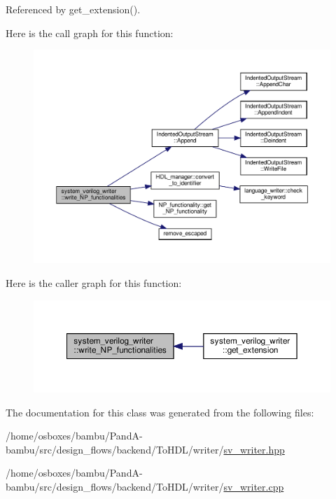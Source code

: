 Referenced by get\+\_\+extension().

Here is the call graph for this function\+:
\nopagebreak
\begin{figure}[H]
\begin{center}
\leavevmode
\includegraphics[width=350pt]{d5/d69/classsystem__verilog__writer_ad9f3428bb7369c26e54a1b7ff7119d9c_cgraph}
\end{center}
\end{figure}
Here is the caller graph for this function\+:
\nopagebreak
\begin{figure}[H]
\begin{center}
\leavevmode
\includegraphics[width=350pt]{d5/d69/classsystem__verilog__writer_ad9f3428bb7369c26e54a1b7ff7119d9c_icgraph}
\end{center}
\end{figure}


The documentation for this class was generated from the following files\+:\begin{DoxyCompactItemize}
\item 
/home/osboxes/bambu/\+Pand\+A-\/bambu/src/design\+\_\+flows/backend/\+To\+H\+D\+L/writer/\hyperlink{sv__writer_8hpp}{sv\+\_\+writer.\+hpp}\item 
/home/osboxes/bambu/\+Pand\+A-\/bambu/src/design\+\_\+flows/backend/\+To\+H\+D\+L/writer/\hyperlink{sv__writer_8cpp}{sv\+\_\+writer.\+cpp}\end{DoxyCompactItemize}

